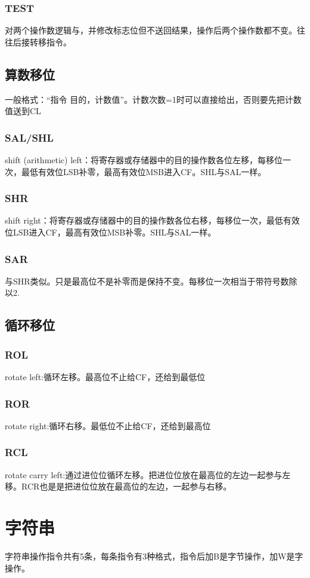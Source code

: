 \subsubsection{TEST}
对两个操作数逻辑与，并修改标志位但不送回结果，操作后两个操作数都不变。往往后接转移指令。
\subsection{算数移位}
一般格式：“指令 目的，计数值”。计数次数=1时可以直接给出，否则要先把计数值送到CL
\subsubsection{SAL/SHL}
shift (arithmetic) left：将寄存器或存储器中的目的操作数各位左移，每移位一次，最低有效位LSB补零，最高有效位MSB进入CF。SHL与SAL一样。
\subsubsection{SHR}
shift right：将寄存器或存储器中的目的操作数各位右移，每移位一次，最低有效位LSB进入CF，最高有效位MSB补零。SHL与SAL一样。
\subsubsection{SAR}
与SHR类似。只是最高位不是补零而是保持不变。每移位一次相当于带符号数除以2.
\subsection{循环移位}
\subsubsection{ROL}
rotate left:循环左移。最高位不止给CF，还给到最低位
\subsubsection{ROR}
rotate right:循环右移。最低位不止给CF，还给到最高位
\subsubsection{RCL}
rotate carry left:通过进位位循环左移。把进位位放在最高位的左边一起参与左移。RCR也是是把进位位放在最高位的左边，一起参与右移。
\section{字符串}
字符串操作指令共有5条，每条指令有3种格式，指令后加B是字节操作，加W是字操作。

